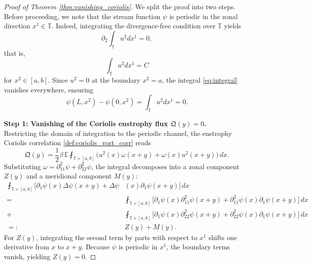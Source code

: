 \documentclass[10pt,a4paper]{amsart}
\begin{document}
\begin{proof}[Proof of Theorem \ref{thm:vanishing_coriolis}]
We split the proof into two steps. 
Before proceeding, we note that the stream function $\psi$ is periodic in the zonal direction $x^1 \in \mathbb{T}$. Indeed, integrating the divergence-free condition over $\mathbb{T}$ yields
\begin{equation}
    \partial_2 \int_{\mathbb{T}} u^2 dx^1 = 0,
\end{equation}
that is,
\begin{equation}\label{eq:integral}
    \int_{\mathbb{T}} u^2 dx^1 = C
\end{equation}
for $x^2\in[a,b]$. Since $u^2 = 0$ at the boundary $x^2=a$, the integral \eqref{eq:integral} vanishes everywhere, ensuring
\begin{equation}
    \psi(L, x^2) - \psi(0, x^2) = \int_{\mathbb{T}} u^2 dx^1 = 0.
\end{equation}

\noindent\textbf{Step 1: Vanishing of the Coriolis enstrophy flux $\mathfrak{Q}(y)=0$.}\\
Restricting the domain of integration to the periodic channel, the enstrophy Coriolis correlation \eqref{def:coriolis_vort_corr} reads 
\begin{equation}\label{eq:Q_restricted}
    \mathfrak{Q}(y) = \frac{1}{2}\beta \, \mathbb{E} \fint_{\mathbb{T} \times [a, b]} \big( u^2(x) \omega(x+y) + \omega(x) u^2(x+y) \big) \, dx.
\end{equation}
Substituting $\omega = \partial_{11}^2 \psi + \partial_{22}^2 \psi$, the integral decomposes into a zonal component $Z(y)$ and a meridional component $M(y)$:
\begin{align*}
    \fint_{\mathbb{T} \times [a, b]} \big[ \partial_1 \psi(x) \Delta \psi(x+y) + \Delta \psi&(x) \partial_1 \psi(x+y) \big] \, dx\\
    =&\fint_{\mathbb{T} \times [a, b]} \big[ \partial_1 \psi(x) \partial_{11}^2 \psi(x+y) + \partial_{11}^2 \psi(x) \partial_1 \psi(x+y) \big] \, dx\\
    +&\fint_{\mathbb{T} \times [a, b]} \big[ \partial_1 \psi(x) \partial_{22}^2 \psi(x+y) + \partial_{22}^2 \psi(x) \partial_1 \psi(x+y) \big] \, dx\\
    =: &Z(y) + M(y).
\end{align*}
For $Z(y)$, integrating the second term by parts with respect to $x^1$ shifts one derivative from $x$ to $x+y$. Because $\psi$ is periodic in $x^1$, the boundary terms vanish, yielding $Z(y) = 0$.


\end{proof}
\end{document}
